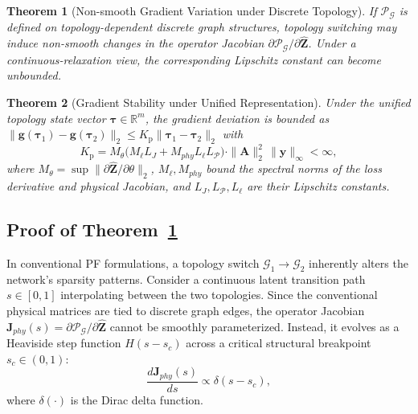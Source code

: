 \documentclass[journal]{IEEEtran}
\newtheorem{theorem}{Theorem}
\begin{document}
\begin{theorem}[Non-smooth Gradient Variation under Discrete Topology]
\label{thm:instability}
If $\mathcal{P}_{\mathcal{G}}$ is defined on topology-dependent discrete graph structures, topology switching may induce non-smooth changes in the operator Jacobian $\partial\mathcal{P}_{\mathcal{G}}/\partial\hat{\mathbf{Z}}$. Under a continuous-relaxation view, the corresponding Lipschitz constant can become unbounded.
\end{theorem}

\begin{theorem}[Gradient Stability under Unified Representation]
\label{thm:stability}
Under the unified topology state vector $\boldsymbol{\tau}\in\mathbb{R}^m$, the gradient deviation is bounded as $\|\mathbf{g}(\boldsymbol{\tau}_1)-\mathbf{g}(\boldsymbol{\tau}_2)\|_2\leq K_{\text{p}}\|\boldsymbol{\tau}_1-\boldsymbol{\tau}_2\|_2$ with
\begin{equation}
K_{\text{p}}=M_{\theta}\big(M_{\ell}L_{J}+M_{phy}L_{\ell}L_{\mathcal{P}}\big) 
\cdot\|\mathbf{A}\|_2^2\,\|\mathbf{y}\|_{\infty}<\infty,
\end{equation}
where $M_{\theta}=\sup\|\partial\hat{\mathbf{Z}}/\partial\theta\|_2$, $M_{\ell},M_{phy}$ bound the spectral norms of the loss derivative and physical Jacobian, and $L_{J},L_{\mathcal{P}},L_{\ell}$ are their Lipschitz constants.
\end{theorem}

\subsection{Proof of Theorem~\ref{thm:instability}}

In conventional PF formulations, a topology switch $\mathcal{G}_1\to\mathcal{G}_2$ inherently alters the network's sparsity patterns. Consider a continuous latent transition path $s\in[0,1]$ interpolating between the two topologies. Since the conventional physical matrices are tied to discrete graph edges, the operator Jacobian $\mathbf{J}_{phy}(s)=\partial\mathcal{P}_{\mathcal{G}}/\partial\hat{\mathbf{Z}}$ cannot be smoothly parameterized. Instead, it evolves as a Heaviside step function $H(s-s_c)$ across a critical structural breakpoint $s_c \in (0,1)$:
\begin{equation}
\frac{d\mathbf{J}_{phy}(s)}{ds}\propto\delta(s-s_c),
\end{equation}
where $\delta(\cdot)$ is the Dirac delta function.
\end{document}
